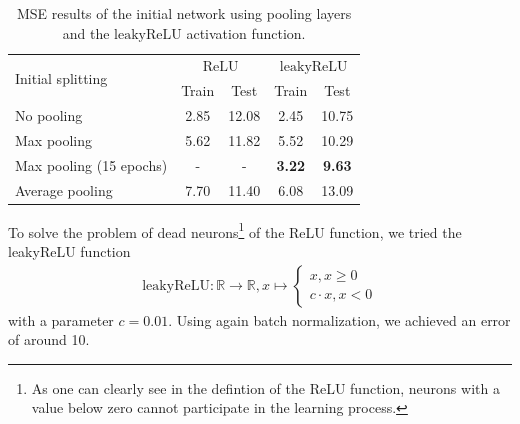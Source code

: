 \documentclass[conference]{IEEEtran}
\begin{document}
\begin{table}[!t]
\normalsize
\renewcommand{\arraystretch}{1.3}
\centering
\begin{tabular}{lcccc}
\toprule
\multirow{2}{*}{Initial splitting}  & \multicolumn{2}{c}{$\mathrm{ReLU}$} & \multicolumn{2}{c}{$\mathrm{leakyReLU}$} \\
 & Train & Test & Train & Test\\
\midrule
No pooling & 2.85 & 12.08 & 2.45 & 10.75 \\
Max pooling & 5.62 & 11.82 & 5.52 & 10.29 \\
Max pooling (15 epochs) & - & - & \textbf{3.22} & \textbf{9.63} \\
Average pooling & 7.70 & 11.40 & 6.08 & 13.09\\
\bottomrule
\end{tabular}
\caption{MSE results of the initial network using pooling layers and the $\mathrm{leakyReLU}$ activation function.}
\end{table}

To solve the problem of dead neurons\footnote{As one can clearly see in the defintion of the ReLU 
function, neurons with a value below zero cannot participate in the learning process.} of the ReLU function, we 
tried the leakyReLU function
\begin{align*}
\mathrm{leakyReLU} : \mathbb{R} \to \mathbb{R}, x \mapsto \begin{cases}
x, x \geq 0\\
c \cdot x, x <0
\end{cases}
\end{align*}
with a parameter $c = 0.01$. Using again batch normalization, we achieved an error of around 10.
\end{document}
